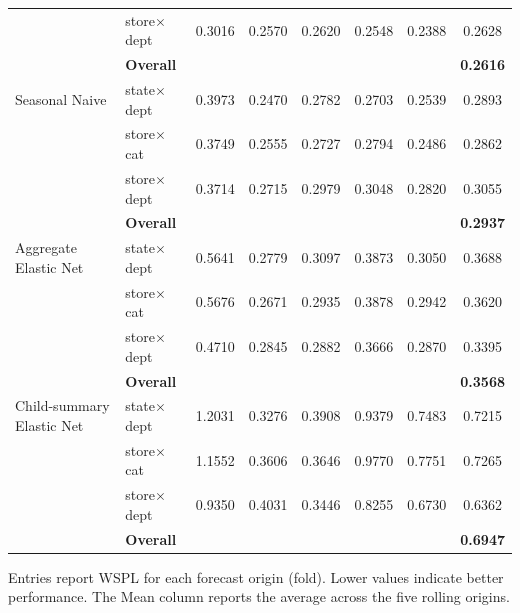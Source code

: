 \documentclass[12pt]{article}
\begin{document}
\begin{table}[H]
\begin{threeparttable}
\begin{tabular}{llccccc|c}
                                   & store$\times$dept      &   0.3016 &   0.2570 &   0.2620 &   0.2548 &   0.2388 &   0.2628 \\
                                   & {\bf Overall} & & & & & & {\bf 0.2616} \\
      \addlinespace
      Seasonal Naive               & state$\times$dept      &   0.3973 &   0.2470 &   0.2782 &   0.2703 &   0.2539 &   0.2893 \\
                                   & store$\times$cat       &   0.3749 &   0.2555 &   0.2727 &   0.2794 &   0.2486 &   0.2862 \\
                                   & store$\times$dept      &   0.3714 &   0.2715 &   0.2979 &   0.3048 &   0.2820 &   0.3055 \\
                                   & {\bf Overall} & & & & & & {\bf 0.2937} \\
      \addlinespace
      Aggregate Elastic Net        & state$\times$dept      &   0.5641 &   0.2779 &   0.3097 &   0.3873 &   0.3050 &   0.3688 \\
                                   & store$\times$cat       &   0.5676 &   0.2671 &   0.2935 &   0.3878 &   0.2942 &   0.3620 \\
                                   & store$\times$dept      &   0.4710 &   0.2845 &   0.2882 &   0.3666 &   0.2870 &   0.3395 \\
                                   & {\bf Overall} & & & & & & {\bf 0.3568} \\
      \addlinespace
      Child-summary Elastic Net    & state$\times$dept      &   1.2031 &   0.3276 &   0.3908 &   0.9379 &   0.7483 &   0.7215 \\
                                   & store$\times$cat       &   1.1552 &   0.3606 &   0.3646 &   0.9770 &   0.7751 &   0.7265 \\
                                   & store$\times$dept      &   0.9350 &   0.4031 &   0.3446 &   0.8255 &   0.6730 &   0.6362 \\
                                   & {\bf Overall} & & & & & & {\bf 0.6947} \\
      \bottomrule
    \end{tabular}
    \begin{tablenotes}
      \footnotesize \item Entries report WSPL for each forecast origin (fold). Lower values indicate better performance. The Mean column reports the average across the five rolling origins.
    \end{tablenotes}
  \end{threeparttable}
\end{table}
\end{document}
